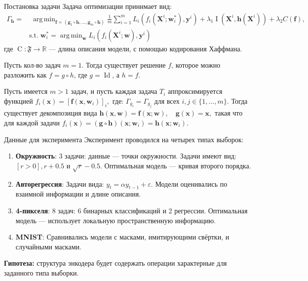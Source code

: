 \documentclass{beamer}
\DeclareMathOperator*{\argmin}{arg\,min}
\begin{document}
\begin{frame}{Постановка задачи}
Задача оптимизации принимает вид: \vspace{-5}
\begin{align*}
    \Gamma_{\mathbf{h}} = &\; \argmin_{\mathbf{f} = (\mathbf{g}_1 \circ \mathbf{h}, \dots, \mathbf{g}_m \circ \mathbf{h})} 
    \frac{1}{m} \sum_{i=1}^m L_i(f_i(\mathbf{X}^i; \mathbf{w}^*_i), \mathbf{y}^i) + \lambda_1\operatorname{I}(\mathbf{X}^i, \mathbf{h}(\mathbf{X}^i))+ \lambda_2C(\mathbf{f}),\\ 
    & \text{s.t.} \; 
    \mathbf{w}^*_i = \argmin_{\mathbf{w}} L_i(f_i(\mathbf{X}^i; \mathbf{w}), \mathbf{y}^i)
\end{align*}
{\small где \(\operatorname{C}: \mathfrak{F} \rightarrow \mathbb{R}\) --- длина описания модели, с помощью кодирования Хаффмана.}
\begin{theorem}[Набиев, 2025]
Пусть кол-во задач $m=1$. Тогда существует решение $f$, которое можно разложить как $f = g \circ h$, где $g = \operatorname{Id}$, а $h = f$.
\end{theorem} \vspace{-5}
\begin{corollary}
Пусть имеется $m > 1$ задач, и пусть каждая задача $T_i$ аппроксимируется функцией $ f_i(\mathbf{x}) = \left[ \mathbf{f}(\mathbf{x}, \mathbf{w}_i) \right]_i, $ где: $\Gamma_{g_i} = \Gamma_{g_j}$ для всех $i, j \in \{1, \dots, m\}$. Тогда существует декомпозиция вида $ \mathbf{h}(\mathbf{x}, \mathbf{w}) = \mathbf{f}(\mathbf{x}; \mathbf{w}), \quad \mathbf{g}(\mathbf{x}) = \mathbf{x},$ такая что для каждой задачи $ f_i(\mathbf{x}) = (\mathbf{g} \circ \mathbf{h})(\mathbf{x}; \mathbf{w}_i) = \mathbf{h}(\mathbf{x}; \mathbf{w}_i)$.
\end{corollary}

\end{frame}
\begin{frame}{Данные для эксперимента}
Эксперимент проводился на четырех типах выборок:
\begin{enumerate}
    \item \textbf{Окружность}: 3 задачи: данные --- точки окружности. Задачи имеют вид: \([r > 0], r + 0.5\) и \(\sqrt{r} - 0.5\). Оптимальная модель --- кривая второго порядка.
    \item \textbf{Авторегрессия}: Задачи вида: \(y_t = \alpha y_{t-1} + \varepsilon\). Модели оценивались по взаимной информации и длине описания.
    \item \textbf{4-пикселя}: 8 задач: 6 бинарных классификаций и 2 регрессии. Оптимальная модель --- использует локальную пространственную информацию.
    \item \textbf{MNIST}: Сравнивались модели с масками, имитирующими свёртки, и случайными масками.
\end{enumerate}
\textbf{Гипотеза:} структура энкодера будет содержать операции характерные для заданного типа выборки.
\end{frame}
\end{document}
